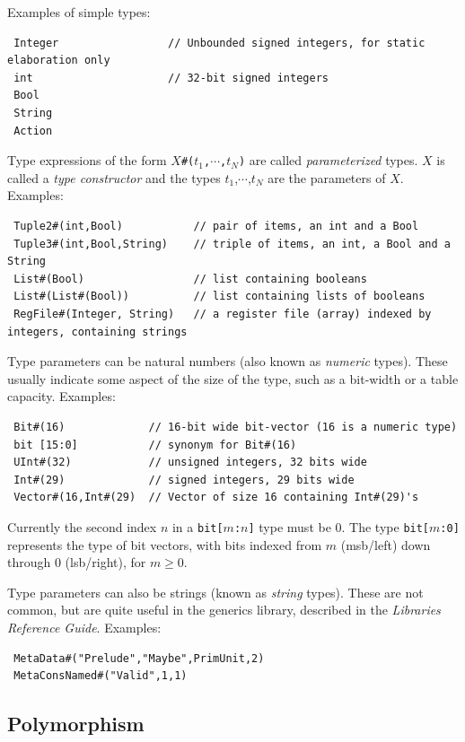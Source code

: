 \documentclass[twoside,letterpaper]{article}
\newcommand{\LibRefGuide}{\emph{Libraries Reference Guide}}
\begin{document}
Examples of simple types:
\begin{verbatim}
 Integer                 // Unbounded signed integers, for static elaboration only
 int                     // 32-bit signed integers
 Bool
 String
 Action
\end{verbatim}

Type expressions of the form \texttt{$X$\#($t_1$,$\cdots$,$t_N$)} are called
\emph{parameterized}
types.  $X$ is called a \emph{type constructor} and the types
$t_1$,$\cdots$,$t_N$ are the parameters of $X$.
Examples:
\begin{verbatim}
 Tuple2#(int,Bool)           // pair of items, an int and a Bool
 Tuple3#(int,Bool,String)    // triple of items, an int, a Bool and a String
 List#(Bool)                 // list containing booleans
 List#(List#(Bool))          // list containing lists of booleans
 RegFile#(Integer, String)   // a register file (array) indexed by integers, containing strings
\end{verbatim}

Type parameters can be natural numbers (also known as \emph{numeric} types).  These
usually indicate some aspect of the size of the type, such as a
bit-width or a table capacity.
Examples:
\begin{verbatim}
 Bit#(16)             // 16-bit wide bit-vector (16 is a numeric type)
 bit [15:0]           // synonym for Bit#(16)
 UInt#(32)            // unsigned integers, 32 bits wide
 Int#(29)             // signed integers, 29 bits wide
 Vector#(16,Int#(29)  // Vector of size 16 containing Int#(29)'s
\end{verbatim}
Currently the second index $n$ in a \texttt{bit[$m$:$n$]} type must be 0.
The type \texttt{bit[$m$:0]} represents the type of bit vectors, with
bits indexed from $m$ (msb/left) down through 0 (lsb/right), for $m
\ge 0$.

Type parameters can also be strings (known as \emph{string} types).
These are not common, but are quite useful in the generics library,
described in the \LibRefGuide.
Examples:
\begin{verbatim}
 MetaData#("Prelude","Maybe",PrimUnit,2)
 MetaConsNamed#("Valid",1,1)
\end{verbatim}


\subsection{Polymorphism}
\end{document}
